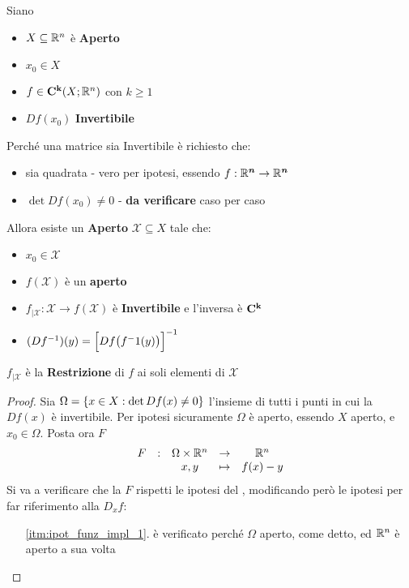 \begin{theorem}
	\label{teo:funz_inv}
	Siano
	\begin{itemize}[noitemsep]
		\item $X \subseteq \mathbb{R}^n$ è \textbf{Aperto}
		\item $x_0 \in X$
		\item $f \in \mathbf{C^{k}}(X;\mathbb{R}^n)$ con $k \geq 1$
		\item $Df(x_0)$ \textbf{Invertibile}
	\end{itemize}
	\begin{note}
		Perché una matrice sia Invertibile è richiesto che:
		\begin{itemize}[nolistsep]
			\item sia quadrata - vero per ipotesi, essendo $f: \mathbb{R}^{\boldsymbol{n}} \to \mathbb{R}^{\boldsymbol{n}}$
			\item $\det Df(x_0) \neq 0$ - \textbf{da verificare} caso per caso
		\end{itemize}
	\end{note}
	Allora esiste un \textbf{Aperto} $\mathcal{X} \subseteq X$ tale che:
	\begin{itemize}[noitemsep]
		\item $x_0 \in \mathcal{X}$
		\item $f(\mathcal{X})$ è un \textbf{aperto}
		\item $f_{|\mathcal{X}}: \mathcal{X} \to f(\mathcal{X})$ è \textbf{Invertibile} e l'inversa è $\mathbf{C^{k}}$
		\item $(Df^{-1})(y) = \Bigl[Df\bigl( f^-1(y) \bigr)\Bigr]^{-1}$
	\end{itemize}
	\begin{note}
		$f_{|\mathcal{X}}$ è la \textbf{Restrizione} di $f$ ai soli elementi di $\mathcal{X}$
	\end{note}
	\begin{proof}
		Sia $\Omega = \left\{x \in X: \det Df(x) \neq 0\right\}$ l'insieme di tutti i punti in cui la $Df(x)$ è invertibile. Per ipotesi sicuramente $\Omega$ è aperto, essendo $X$ aperto, e $x_0 \in \Omega$.
		Posta ora $F$
		\[\begin{array}{ccccc} {F} & : & {\Omega \times \mathbb{R}^n} & \to & {\mathbb{R}^n} \\ & & {x, y} & \mapsto & {f(x) - y} \\ \end{array}\]
		Si va a verificare che la $F$ rispetti le ipotesi del , modificando però le ipotesi per far riferimento alla $D_xf$:
		\begin{enumerate}[noitemsep]
			\item[\ref{itm:ipot_funz_impl_1}.] è verificato perché $\Omega$ aperto, come detto, ed $\mathbb{R}^n$ è aperto a sua volta

\end{enumerate}
\end{proof}
\end{theorem}
